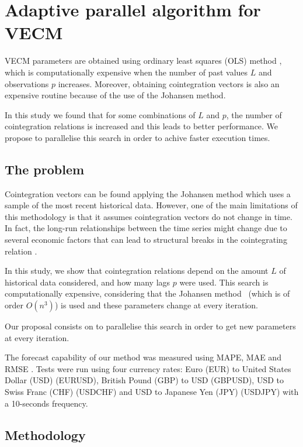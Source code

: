 
\chapter{Adaptive parallel algorithm for VECM}

\vspace{0.5cm} 

VECM parameters are obtained using ordinary least squares (OLS) method
\cite{golub1980}, which is computationally expensive when the number of past
values $L$ and observations $p$ increases. Moreover, obtaining cointegration
vectors is also an expensive routine because of the use of the Johansen method.

In this study we found that for some combinations of $L$ and $p$, the number of
cointegration relations is increased and this leads to better performance. We
propose to parallelise this search in order to achive faster execution times.


\section{The problem} \label{sec:proposal}

Cointegration vectors can be found applying the Johansen method which uses a
sample of the most recent historical data. However, one of the main limitations of this
methodology is that it assumes cointegration vectors do not change in time.  In
fact, the long-run relationships between the time series might change due to
several economic factors that can lead to structural breaks in the cointegrating
relation \cite{gregoryETal1996}. 

In this study, we show that cointegration relations depend on the amount $L$ of
historical data considered, and how many lags $p$ were used. This search is
computationally expensive, considering that the Johansen
method~\cite{johansen1995} (which is of order $O(n^3)$) is used and these
parameters change at every iteration. 

Our proposal consists on to parallelise this search in order to get new
parameters at every iteration. 

The forecast capability of our method was measured using MAPE, MAE and
RMSE \cite{armstrong1992}. Tests were run using four currency rates: Euro (EUR) to
United States Dollar (USD) (EURUSD), British Pound (GBP) to USD (GBPUSD), USD to Swiss
Franc (CHF) (USDCHF) and USD to Japanese Yen (JPY) (USDJPY) with a 10-seconds frequency.


\section{Methodology}

